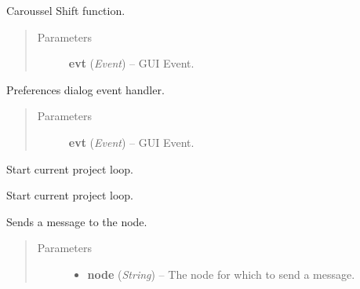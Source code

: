 \documentclass[letterpaper,10pt,english]{sphinxmanual}
\begin{document}
\begin{fulllineitems}

\begin{fulllineitems}
\label{wos:wos.GUI.Shift}
Caroussel Shift function.
\begin{quote}\begin{description}
\item[{Parameters}] \leavevmode
\textbf{evt} (\emph{Event}) -- GUI Event.

\end{description}\end{quote}

\end{fulllineitems}


\begin{fulllineitems}
\label{wos:wos.GUI.ShowPreferences}
Preferences dialog event handler.
\begin{quote}\begin{description}
\item[{Parameters}] \leavevmode
\textbf{evt} (\emph{Event}) -- GUI Event.

\end{description}\end{quote}

\end{fulllineitems}


\begin{fulllineitems}
\label{wos:wos.GUI.StartCurrentProject}
Start current project loop.

\end{fulllineitems}


\begin{fulllineitems}
\label{wos:wos.GUI.StartCurrentSession}
Start current project loop.

\end{fulllineitems}


\begin{fulllineitems}
\label{wos:wos.GUI.SwnpSend}
Sends a message to the node.
\begin{quote}\begin{description}
\item[{Parameters}] \leavevmode\begin{itemize}
\item {} 
\textbf{node} (\emph{String}) -- The node for which to send a message.


\end{itemize}
\end{description}
\end{quote}
\end{fulllineitems}
\end{fulllineitems}
\end{document}
